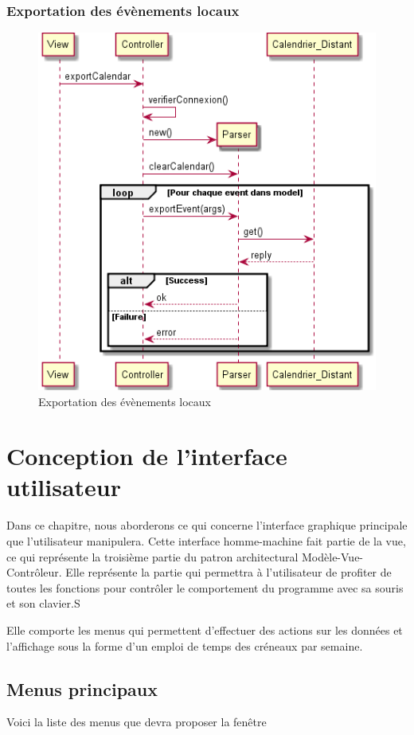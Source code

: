 		\subsection{Exportation des évènements locaux}
			\begin{figure}[!h]
				\centering
				\includegraphics[scale=0.65]{diagseq_exportEvent.png}
				\caption{Exportation des évènements locaux}
			\end{figure}
			\FloatBarrier

\chapter{Conception de l'interface utilisateur}
    Dans ce chapitre, nous aborderons ce qui concerne l'interface graphique principale que l'utilisateur manipulera. Cette interface homme-machine fait partie de la vue, ce qui représente la troisième partie du patron architectural Modèle-Vue-Contrôleur. Elle représente la partie qui permettra à l'utilisateur de profiter de toutes les fonctions pour contrôler le comportement du programme avec sa souris et son clavier.S
    
    Elle comporte les menus qui permettent d'effectuer des actions sur les données et l'affichage sous la forme d'un emploi de temps des créneaux par semaine.
    
    
    

    \section{Menus principaux}
        Voici la liste des menus que devra proposer la fenêtre 


